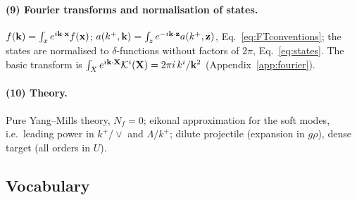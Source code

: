 \paragraph{(9) Fourier transforms and normalisation of states.} $f(\mathbf{k})=\int_xe^{i\mathbf{k}\cdot\mathbf{x}}f(\mathbf{x})$; $a(k^+,\mathbf{k})=\int_ze^{-i\mathbf{k}\cdot\mathbf{z}}a(k^+,\mathbf{z})$, Eq.~\eqref{eq:FTconventions}; the states are normalised to $\delta$-functions without factors of $2\pi$, Eq.~\eqref{eq:states}. The basic transform is $\int_Xe^{i\mathbf{k}\cdot\mathbf{X}}\mathcal{K}^i(\mathbf{X})=2\pi i\,k^i/\mathbf{k}^2$ (Appendix~\ref{app:fourier}).

\paragraph{(10) Theory.} Pure Yang--Mills theory, $N_f=0$; eikonal approximation for the soft modes, i.e.\ leading power in $k^+/\vee$ and $\Lambda/k^+$; dilute projectile (expansion in $g\rho$), dense target (all orders in $U$).

\subsection{Vocabulary}\label{sec:vocabulary}

